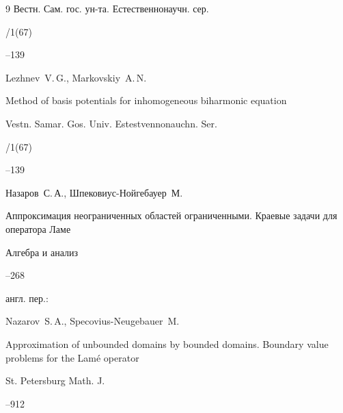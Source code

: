 \begin{thebibliography}{9}
\jour Вестн. Сам. гос. ун-та. Естественнонаучн. сер.


/1(67)

--139

\misctransl

\by Lezhnev~V.\,G., Markovskiy~A.\,N.

\paper Method of basis potentials for inhomogeneous biharmonic equation

\jour Vestn. Samar. Gos. Univ. Estestvennonauchn. Ser.


/1(67)

--139




\by Назаров~С.\,А., Шпековиус-Нойгебауер~М.

\paper Аппроксимация неограниченных областей ограниченными. Краевые задачи для оператора Ламе

\jour Алгебра и анализ




--268

\transl англ. пер.:~

\by Nazarov~S.\,A., Specovius-Neugebauer~M.

\paper Approximation of unbounded domains by bounded domains. Boundary value problems for the Lam\'e operator

\jour St. Petersburg Math. J.




--912





\end{thebibliography}



\hskip6.5cm \thedate \par

\hskip6.5cm\therevdate\par



\vspace{-3mm}



\makeengtitle



\renewcommand{\baselinestretch}{0.9}



\newpage



%

